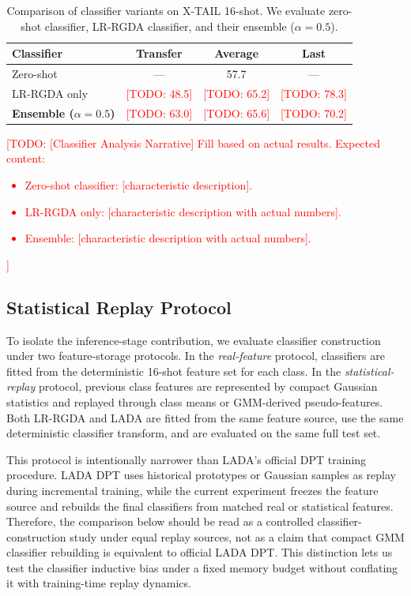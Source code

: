 \documentclass{article}
\newcommand{\todo}[1]{\textcolor{red}{[TODO: #1]}}
\begin{document}
\begin{table}[t]
\centering
\caption{Comparison of classifier variants on X-TAIL 16-shot. We evaluate zero-shot classifier, LR-RGDA classifier, and their ensemble ($\alpha=0.5$).}
\label{tab:alpha}
\begin{tabular}{l|ccc}
\toprule
Classifier & Transfer & Average & Last \\
\midrule
Zero-shot & --- & 57.7 & --- \\
LR-RGDA only & \todo{48.5} & \todo{65.2} & \todo{78.3} \\
\textbf{Ensemble ($\alpha=0.5$)} & \todo{63.0} & \todo{65.6} & \todo{70.2} \\
\bottomrule
\end{tabular}
\end{table}

\todo{[Classifier Analysis Narrative] Fill based on actual results. Expected content:
\begin{itemize}
    \item Zero-shot classifier: [characteristic description].
    \item LR-RGDA only: [characteristic description with actual numbers].
    \item Ensemble: [characteristic description with actual numbers].
\end{itemize}
}
\fi

\subsection{Statistical Replay Protocol}
\label{sec:stat_replay}

To isolate the inference-stage contribution, we evaluate classifier construction under two feature-storage protocols. In the \emph{real-feature} protocol, classifiers are fitted from the deterministic 16-shot feature set for each class. In the \emph{statistical-replay} protocol, previous class features are represented by compact Gaussian statistics and replayed through class means or GMM-derived pseudo-features. Both LR-RGDA and LADA are fitted from the same feature source, use the same deterministic classifier transform, and are evaluated on the same full test set.

This protocol is intentionally narrower than LADA's official DPT training procedure. LADA DPT uses historical prototypes or Gaussian samples as replay during incremental training, while the current experiment freezes the feature source and rebuilds the final classifiers from matched real or statistical features. Therefore, the comparison below should be read as a controlled classifier-construction study under equal replay sources, not as a claim that compact GMM classifier rebuilding is equivalent to official LADA DPT. This distinction lets us test the classifier inductive bias under a fixed memory budget without conflating it with training-time replay dynamics.
\end{document}
